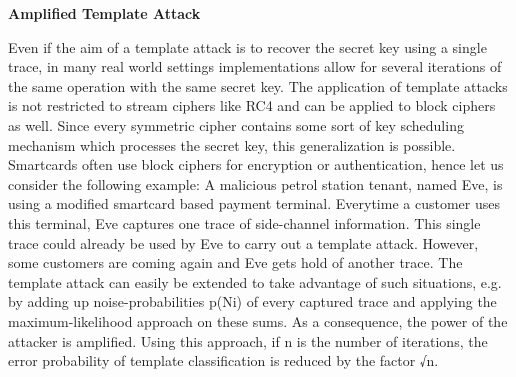 \textbf{Amplified Template Attack}

    Even if the aim of a template attack is to recover the secret key using a
    single trace, in many real world settings implementations allow for several
    iterations of the same operation with the same secret key. The application
    of template attacks is not restricted to stream ciphers like RC4 and can be
    applied to block ciphers as well. Since every symmetric cipher contains some
    sort of key scheduling mechanism which processes the secret key, this
    generalization is possible. Smartcards often use block ciphers for
    encryption or authentication, hence let us consider the following example: A
    malicious petrol station tenant, named Eve, is using a modified smartcard
    based payment terminal. Everytime a customer uses this terminal, Eve
    captures one trace of side-channel information. This single trace could
    already be used by Eve to carry out a template attack. However, some
    customers are coming again and Eve gets hold of another trace. The template
    attack can easily be extended to take advantage of such situations, e.g. by
    adding up noise-probabilities p(Ni) of every captured trace and applying the
    maximum-likelihood approach on these sums. As a consequence, the power of
    the attacker is amplified. Using this approach, if n is the number of
    iterations, the error probability of template classification is reduced by
    the factor √n. 
